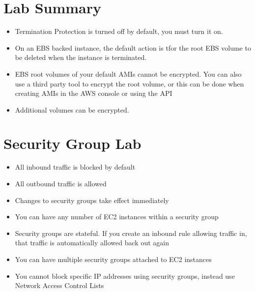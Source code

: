 \documentclass{article}
\begin{document}
\section{Lab Summary}
\begin{itemize}
\item
Termination Protection is turned off by default, you must turn it on.

\item
On an EBS backed instance, the default action is tfor the root EBS volume to be deleted when the instance is terminated.

\item
EBS root volumes of your default AMIs cannot be encrypted. You can also use a third party tool to encrypt the root volume, or this can be done when creating AMIs in the AWS console or using the API

\item
Additional volumes can be encrypted.

\end{itemize}

\section{Security Group Lab}
\begin{itemize}
\item
All inbound traffic is blocked by default

\item
All outbound traffic is allowed

\item
Changes to security groups take effect immediately

\item
You can have any number of EC2 instances within a security group

\item
Security groups are stateful. If you create an inbound rule allowing traffic in, that traffic is automatically allowed back out again

\item
You can have multiple security groups attached to EC2 instances

\item
You cannot block specific IP addresses using security groups, instead use Network Access Control Lists
\end{itemize}
\end{document}
